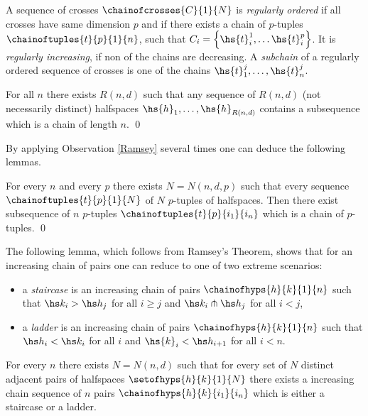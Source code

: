  A sequence of crosses $\chainofcrosses{C}{1}{N}$ is \emph{regularly ordered} if all crosses have same dimension $p$ and if there exists a chain of $p$-tuples $\chainoftuples{t}{p}{1}{n}$, such that $C_i = \left\{\hs{t}^1_i,\dots \hs{t}^p_i\right\}$. It is \emph{regularly increasing}, if non of the chains are decreasing.
 A \emph{subchain} of a regularly ordered sequence of crosses is one of the chains $\hs{t}^j_1,\dots, \hs{t}^j_n$.


\begin{observation}
	\label{Ramsey}
	For all $n$ there exists $R(n,d)$ such that any sequence of $R(n,d)$ (not necessarily distinct) halfspaces $\hs{h}_1,\ldots,\hs{h}_{R(n,d)}$ contains a subsequence which is a chain of length $n$.%
\qed
\end{observation}

By applying Observation \ref{Ramsey} several times one can deduce the following lemmas.

\begin{lemma}\label{Ramseypowerup}
	For every $n$ and every $p$ there exists $N=N(n,d,p)$ such that every sequence $\chainoftuples{t}{p}{1}{N}$ of $N$  $p$-tuples of halfspaces. Then there exist subsequence of $n$ $p$-tuples $\chainoftuples{t}{p}{i_1}{i_n}$ which is a chain of $p$-tuples. \qed
\end{lemma}

The following lemma, which follows from Ramsey's Theorem, shows that for an increasing chain of pairs one can reduce to one of two extreme scenarios:
\begin{itemize}
	\item a \emph{staircase} is an increasing chain of pairs $\chainofhyps{h}{k}{1}{n}$ such that $\hs k_i > \hs h_j$ for all $i\geq j$ and $\hs k_i \pitchfork \hs h_j$ for all $i<j$,
	
	\item a \emph{ladder} is an increasing chain of pairs $\chainofhyps{h}{k}{1}{n}$ such that $\hs h_i < \hs k_i$ for all $i$ and $\hs{k}_i < \hs h_{i+1}$ for all $i<n$.
\end{itemize}

\begin{lemma}\label{reductionforpairs}
	For every $n$ there exists $N=N(n,d)$ such that for every set of $N$ distinct adjacent pairs of halfspaces $\setofhyps{h}{k}{1}{N}$  there exists a increasing chain sequence of $n$ pairs $\chainofhyps{h}{k}{i_1}{i_n}$ which is either a staircase or a ladder.
\end{lemma}

